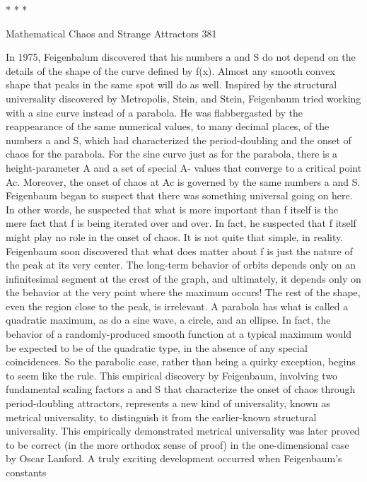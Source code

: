                                          *   *   *




Mathematical Chaos and Strange Attractors                                              381

In 1975, Feigenbalum discovered that his numbers a and S do not depend on the
details of the shape of the curve defined by f(x). Almost any smooth convex shape
that peaks in the same spot will do as well. Inspired by the structural universality
discovered by Metropolis, Stein, and Stein, Feigenbaum tried working with a sine
curve instead of a parabola. He was flabbergasted by the reappearance of the same
numerical values, to many decimal places, of the numbers a and S, which had
characterized the period-doubling and the onset of chaos for the parabola. For the sine
curve just as for the parabola, there is a height-parameter A and a set of special A-
values that converge to a critical point Ac. Moreover, the onset of chaos at Ac is
governed by the same numbers a and S. Feigenbaum began to suspect that there was
something universal going on here. In other words, he suspected that what is more
important than f itself is the mere fact that f is being iterated over and over. In fact, he
suspected that f itself might play no role in the onset of chaos.
        It is not quite that simple, in reality. Feigenbaum soon discovered that what
does matter about f is just the nature of the peak at its very center. The long-term
behavior of orbits depends only on an infinitesimal segment at the crest of the graph,
and ultimately, it depends only on the behavior at the very point where the maximum
occurs! The rest of the shape, even the region close to the peak, is irrelevant. A
parabola has what is called a quadratic maximum, as do a sine wave, a circle, and an
ellipse. In fact, the behavior of a randomly-produced smooth function at a typical
maximum would be expected to be of the quadratic type, in the absence of any special
coincidences. So the parabolic case, rather than being a quirky exception, begins to
seem like the rule. This empirical discovery by Feigenbaum, involving two
fundamental scaling factors a and S that characterize the onset of chaos through
period-doubling attractors, represents a new kind of universality, known as metrical
universality, to distinguish it from the earlier-known structural universality. This
empirically demonstrated metrical universality was later proved to be correct (in the
more orthodox sense of proof) in the one-dimensional case by Oscar Lanford.
        A truly exciting development occurred when Feigenbaum's constants
